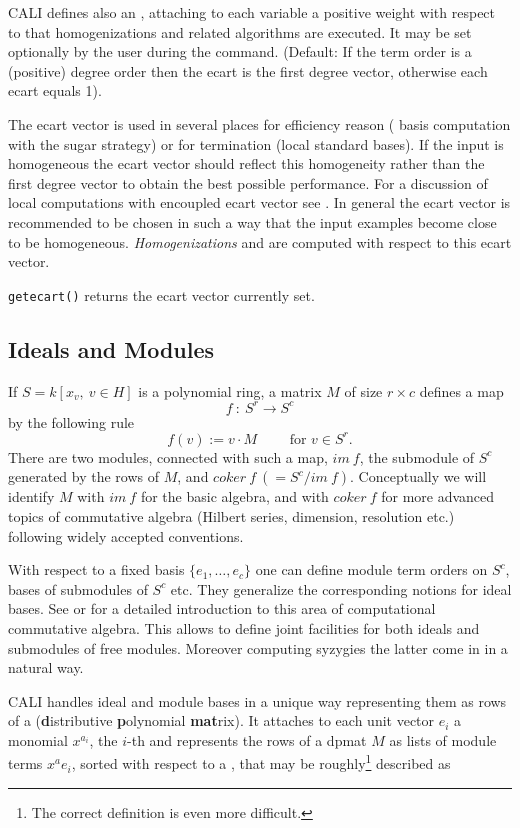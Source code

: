 CALI defines also an , attaching to each variable a
positive weight with respect to that homogenizations and related
algorithms are executed. It may be set optionally by the user during
the  command.  (Default: If the term order is a
(positive) degree order then the ecart is the first degree vector,
otherwise each ecart equals 1).

The ecart vector is used in several places for efficiency reason (\gr
basis computation with the sugar strategy) or for termination (local
standard bases). If the input is homogeneous the ecart vector should
reflect this homogeneity rather than the first degree vector to
obtain the best possible performance. For a discussion of local
computations with encoupled ecart vector see \cite{tcah}. In general
the ecart vector is recommended to be chosen in such a way that the
input examples become close to be homogeneous. {\em Homogenizations}
and  are computed with respect to this ecart
vector.
\medskip

\noindent \verb|getecart()| returns the ecart vector
currently set.


\subsection{Ideals and Modules}

If $S=k[x_v,\ v \in H]$ is a polynomial ring, a matrix $M$ of size
$r\times c$ defines a map
\[f\ :\ S^r \longrightarrow S^c\]
by the following rule
\[ f(v):=v\cdot M \qquad \mbox{ for } v \in S^r.\]
There are two modules, connected with such a map, $im\ f$, the
submodule of $S^c$ generated by the rows of $M$, and $coker\ f\
(=S^c/im\ f)$. Conceptually we will identify $M$ with $im\ f$ for the
basic algebra, and with $coker\ f$ for more advanced topics of
commutative algebra (Hilbert series, dimension, resolution etc.)
following widely accepted conventions.

With respect to a fixed basis $\{e_1,\ldots ,e_c\}$ one can define
module term orders on $S^c$, \gr bases of submodules of $S^c$ etc.
They generalize the corresponding notions for ideal bases. See
\cite{E} or \cite{MM} for a detailed introduction to this area of
computational commutative algebra. This allows to define joint
facilities for both ideals and submodules of free modules. Moreover
computing syzygies the latter come in in a natural way.

CALI handles ideal and module bases in a unique way representing them
as rows of a \ind{dpmat} ({\bf d}istributive {\bf p}olynomial {\bf
mat}rix). It attaches to each unit vector $e_i$ a monomial $x^{a_i}$,
the $i$-th \ind{column degree} and represents the rows of a dpmat $M$
as lists of module terms $x^ae_i$, sorted with respect to a
, that may be roughly\footnote{The correct
definition is even more difficult.} described as 
\bigskip


